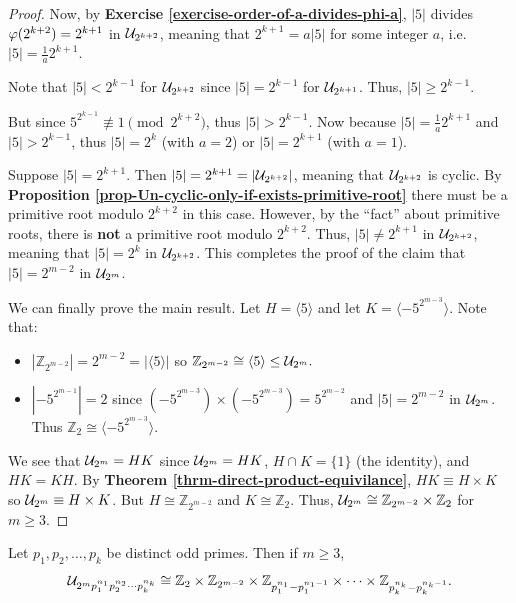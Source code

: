 \begin{proof}
    Now, by \textbf{Exercise \ref{exercise-order-of-a-divides-phi-a}}, $|5|$ divides $\varphi(2^{k+2}) = 2^{k+1}$ in $\mathcal{U}_{2^{k+2}}$, meaning that $2^{k+1} = a|5|$ for some integer $a$, i.e. $|5| = \frac1a2^{k+1}$.

    Note that $|5| < 2^{k-1}$ for $\mathcal{U}_{2^{k+2}}$ since $|5| = 2^{k-1}$ for $\mathcal{U}_{2^{k+1}}$. Thus, $|5| \geq 2^{k-1}$.

    But since $5^{2^{k-1}} \not\equiv 1 \pmod{2^{k+2}}$, thus $|5| > 2^{k-1}$. Now because $|5| = \frac1a2^{k+1}$ and $|5| > 2^{k-1}$, thus $|5| = 2^k$ (with $a = 2$) or $|5| = 2^{k+1}$ (with $a = 1$).

    Suppose $|5| = 2^{k+1}$. Then $|5| = 2^{k+1} = |\mathcal{U}_{2^{k+2}}|$, meaning that $\mathcal{U}_{2^{k+2}}$ is cyclic. By \textbf{Proposition \ref{prop-Un-cyclic-only-if-exists-primitive-root}} there must be a primitive root modulo $2^{k+2}$ in this case. However, by the ``fact'' about primitive roots, there is \textbf{not} a primitive root modulo $2^{k+2}$. Thus, $|5| \neq 2^{k+1}$ in $\mathcal{U}_{2^{k+2}}$, meaning that $|5| = 2^k$ in $\mathcal{U}_{2^{k+2}}$. This completes the proof of the claim that $|5| = 2^{m-2}$ in $\mathcal{U}_{2^m}$.

    We can finally prove the main result. Let $H = \langle 5 \rangle$ and let $K = \langle -5^{2^{m-3}} \rangle$. Note that:
    \begin{itemize}
        \item $|\mathbb{Z}_{2^{m-2}}| = 2^{m-2} = |\langle 5 \rangle|$ so $\mathbb{Z}_{2^{m-2}} \cong \langle 5 \rangle \leq \mathcal{U}_{2^m}.$
        \item $|-5^{2^{m-1}}| = 2$ since $\left(-5^{2^{m-3}}\right) \times \left(-5^{2^{m-3}}\right) = 5^{2^{m-2}}$ and $|5| = 2^{m-2}$ in $\mathcal{U}_{2^m}$. Thus $\mathbb{Z}_2 \cong \langle -5^{2^{m-3}} \rangle$.
    \end{itemize}
     We see that $\mathcal{U}_{2^m} = HK$ since $\mathcal{U}_{2^m} = HK$, $H \cap K = \{1\}$ (the identity), and $HK = KH$. By \textbf{Theorem \ref{thrm-direct-product-equivilance}}, $HK \equiv H \times K$ so $\mathcal{U}_{2^m} \equiv H \times K$. But $H \cong \mathbb{Z}_{2^{m-2}}$ and $K \cong \mathbb{Z}_2$. Thus, $\mathcal{U}_{2^m} \cong \mathbb{Z}_{2^{m-2}} \times \mathbb{Z}_2$ for $m \geq 3$.
\end{proof}

\begin{corollary}
    Let $p_1, p_2, \dots, p_k$ be distinct odd primes. Then if $m \geq 3$,
    \[
        \mathcal{U}_{2^mp_1^{n_1}p_2^{n_2}\cdots p_k^{n_k}} \cong \mathbb{Z}_2\times\mathbb{Z}_{2^{m-2}}\times\mathbb{Z}_{p_1^{n_1} - p_1^{n_1-1}}\times\cdots\times\mathbb{Z}_{p_k^{n_k} - p_k^{n_k-1}}.
    \]
\end{corollary}

